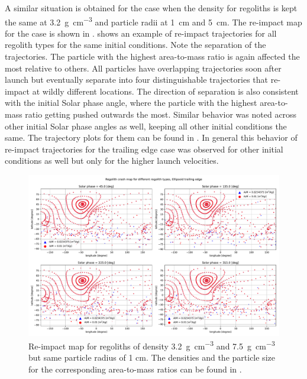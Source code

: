 %
\newline\newline
%
A similar situation is obtained for the case when the density for regoliths is kept the same at \SI{3.2}{\gram\per\centi\metre\cubed} and particle radii at \SI{1}{\centi\metre} and \SI{5}{\centi\metre}. The re-impact map for the case is shown in .  shows an example of re-impact trajectories for all regolith types for the same initial conditions. Note the separation of the trajectories. The particle with the highest area-to-mass ratio is again affected the most relative to others. All particles have overlapping trajectories soon after launch but eventually separate into four distinguishable trajectories that re-impact at wildly different locations. The direction of separation is also consistent with the initial Solar phase angle, where the particle with the highest area-to-mass ratio getting pushed outwards the most. Similar behavior was noted across other initial Solar phase angles as well, keeping all other initial conditions the same. The trajectory plots for them can be found in . In general this behavior of re-impact trajectories for the trailing edge case was observed for other initial conditions as well but only for the higher launch velocities.
\begin{figure}[htb]
\centering
\captionsetup{justification=centering}
\includegraphics[angle=90, width=\textwidth, height=\textheight, keepaspectratio=true]{trailing_edge_perturbations/crashMap_3P2_7P5_density_1cm_radius.pdf}
\caption{Re-impact map for regoliths of density \SI{3.2}{\gram\per\centi\metre\cubed} and \SI{7.5}{\gram\per\centi\metre\cubed} but same particle radius of 1 cm. The densities and the particle size for the corresponding area-to-mass ratios can be found in .}
\label{fig:trailingEdge_crashmap_3P2_7P5_density_1cm_radius}
\end{figure}
